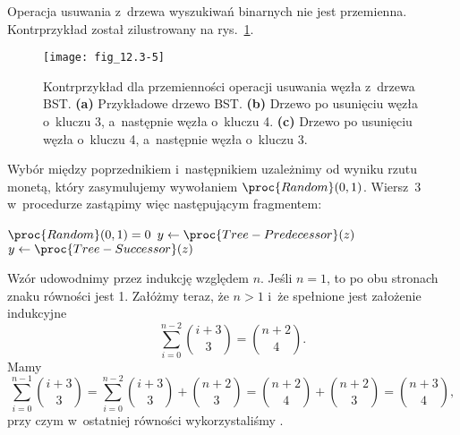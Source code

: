 \exercise %
Operacja usuwania z~drzewa wyszukiwań binarnych nie jest przemienna. Kontrprzykład został zilustrowany na rys.\ \ref{fig:12.3-5}.
\begin{figure}[ht]
	\begin{center}
		\texttt{[image: fig\_12.3-5]}
	\end{center}
	\caption{Kontrprzykład dla przemienności operacji usuwania węzła z~drzewa BST.
{\sffamily\bfseries(a)} Przykładowe drzewo BST.
{\sffamily\bfseries(b)} Drzewo po usunięciu węzła o~kluczu 3, a~następnie węzła o~kluczu 4.
{\sffamily\bfseries(c)} Drzewo po usunięciu węzła o~kluczu 4, a~następnie węzła o~kluczu 3.} \label{fig:12.3-5}
\end{figure}

\exercise %
Wybór między poprzednikiem i~następnikiem uzależnimy od wyniku rzutu monetą, który zasymulujemy wywołaniem $\proc{Random}(0,1)$.
Wiersz~3 w~procedurze  zastąpimy więc następującym fragmentem:
\begin{codebox}
\zi	\If $\proc{Random}(0,1)=0$
\zi		\Then $y\gets\proc{Tree-Predecessor}(z)$
\zi		\Else $y\gets\proc{Tree-Successor}(z)$
\zi		\End
\end{codebox}


\exercise %
Wzór udowodnimy przez indukcję względem $n$.
Jeśli $n=1$, to po obu stronach znaku równości jest 1.
Załóżmy teraz, że $n>1$ i~że spełnione jest założenie indukcyjne
\[
	\sum_{i=0}^{n-2}\binom{i+3}{3} = \binom{n+2}{4}.
\]
Mamy
\[
	\sum_{i=0}^{n-1}\binom{i+3}{3} = \sum_{i=0}^{n-2}\binom{i+3}{3}+\binom{n+2}{3} = \binom{n+2}{4}+\binom{n+2}{3} = \binom{n+3}{4},
\]
przy czym w~ostatniej równości wykorzystaliśmy .

\exercise %
\exercise %
\exercise %
\exercise %

\problems


\subproblem %
\subproblem %
\subproblem %
\subproblem %



\subproblem %
\subproblem %
\subproblem %
\subproblem %
\subproblem %
\subproblem %


\subproblem %
\subproblem %
\subproblem %

\subproblem %

\endinput
